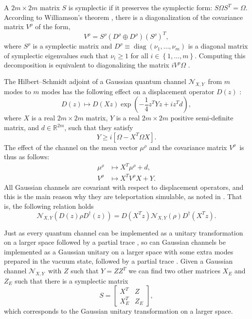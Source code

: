\documentclass[apsrev,twocolumn]{revtex4-1}%
\begin{document}
A $2m\times2m$ matrix $S$ is symplectic if it preserves the symplectic form:
$S\Omega S^{T}=\Omega$. According to Williamson's theorem \cite{W36}, there is
a diagonalization of the covariance matrix $V^{\rho}$ of the form,
\begin{equation}
V^{\rho}=S^{\rho}\left(  D^{\rho}\oplus D^{\rho}\right)  \left(  S^{\rho
}\right)  ^{T},
\end{equation}
where $S^{\rho}$ is a symplectic matrix and $D^{\rho}\equiv\operatorname{diag}%
(\nu_{1},\ldots,\nu_{m})$ is a diagonal matrix of symplectic eigenvalues such
that $\nu_{i}\geq1$ for all $i\in\left\{  1,\ldots,m\right\}  $. Computing
this decomposition is equivalent to diagonalizing the matrix $iV^{\rho}\Omega$
\cite[Appendix~A]{WTLB16}.

The Hilbert--Schmidt adjoint of a Gaussian quantum channel $\mathcal{N}_{X,Y}%
$\ from $m$ modes to $m$ modes has the following effect on a displacement
operator $D(z)$ \cite{CEGH08}:%
\begin{equation}
D(z)\longmapsto D(Xz)\exp\left(  -\frac{1}{4}z^{T}Yz+iz^{T}d\right)
,\label{eq:G-chan-1}%
\end{equation}
where $X$ is a real $2m\times2m$ matrix, $Y$ is a real $2m\times2m$ positive
semi-definite matrix, and $d\in\mathbb{R}^{2m}$, such that they satisfy%
\begin{equation}
Y\geq i\left[  \Omega-X^{T}\Omega X\right]  .\label{eq:Gaussian-CP-condition}%
\end{equation}
The effect of the channel on the mean vector $\mu^{\rho}$ and the covariance
matrix $V^{\rho}$\ is thus as follows:%
\begin{align}
\mu^{\rho} &  \longmapsto X^{T}\mu^{\rho}+d,\\
V^{\rho} &  \longmapsto X^{T}V^{\rho}X+Y.\label{eq:G-chan-3}%
\end{align}
All Gaussian channels are covariant with respect to displacement operators,
and this is the main reason why they are teleportation simulable, as noted in
\cite{WPG07,NFC09}. That is, the following relation holds%
\begin{equation}
\mathcal{N}_{X,Y}(D(z)\rho D^{\dag}(z))=D(X^{T}z)\mathcal{N}_{X,Y}%
(\rho)D^{\dag}(X^{T}z).\label{eq:covariance-gaussian}%
\end{equation}


Just as every quantum channel can be implemented as a unitary transformation
on a larger space followed by a partial trace \cite{S55}, so can Gaussian
channels be implemented as a Gaussian unitary on a larger space with some
extra modes prepared in the vacuum state, followed by a partial trace
\cite{CEGH08}. Given a Gaussian channel $\mathcal{N}_{X,Y}$\ with $Z$ such
that $Y=ZZ^{T}$ we can find two other matrices $X_{E}$ and $Z_{E}$ such that
there is a symplectic matrix
\begin{equation}
S=%
\begin{bmatrix}
X^{T} & Z\\
X_{E}^{T} & Z_{E}%
\end{bmatrix}
,\label{eq:gaussian-dilation}%
\end{equation}
which corresponds to the Gaussian unitary transformation on a larger space.
\end{document}
